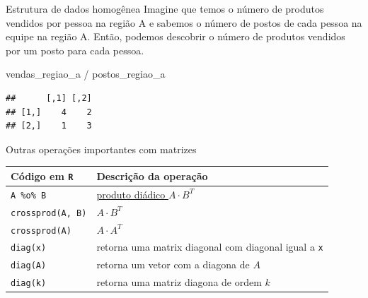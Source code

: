\documentclass[
  10pt,
  ignorenonframetext,
]{beamer}
\newenvironment{Shaded}{}{}
\newcommand{\NormalTok}[1]{#1}
\newcommand{\OperatorTok}[1]{#1}
\newcommand{\StringTok}[1]{\textcolor[rgb]{0.00,0.50,0.50}{#1}}
\begin{document}
\begin{frame}[fragile]{Estrutura de dados homogênea}
\protect\hypertarget{estrutura-de-dados-homoguxeanea-16}{}
Imagine que temos o número de produtos vendidos por pessoa na região A e
sabemos o número de postos de cada pessoa na equipe na região A. Então,
podemos descobrir o número de produtos vendidos por um posto para cada
pessoa.

\begin{Shaded}
\begin{Highlighting}[]
\NormalTok{vendas\_regiao\_a }\OperatorTok{/}\StringTok{ }\NormalTok{postos\_regiao\_a}
\end{Highlighting}
\end{Shaded}

\begin{verbatim}
##      [,1] [,2]
## [1,]    4    2
## [2,]    1    3
\end{verbatim}
\end{frame}

\begin{frame}[fragile]{Outras operações importantes com matrizes}
\protect\hypertarget{outras-operauxe7uxf5es-importantes-com-matrizes}{}
\begin{longtable}[]{@{}ll@{}}
\toprule
Código em \texttt{R} & Descrição da operação\tabularnewline
\midrule
\endhead
\texttt{A\ \%o\%\ B} &
\href{https://pt.wikipedia.org/wiki/Produto_diádico}{produto diádico
\(A\cdot B^T\)}\tabularnewline
\texttt{crossprod(A,\ B)} &
\href{https://pt.wikipedia.org/wiki/Produto_diádico}{\(A\cdot B^T\)}\tabularnewline
\texttt{crossprod(A)} &
\href{https://pt.wikipedia.org/wiki/Produto_diádico}{\(A\cdot A^T\)}\tabularnewline
\texttt{diag(x)} & retorna uma matrix diagonal com diagonal igual a
\texttt{x}\tabularnewline
\texttt{diag(A)} & retorna um vetor com a diagona de
\(A\)\tabularnewline
\texttt{diag(k)} & retorna uma matriz diagona de ordem
\(k\)\tabularnewline
\bottomrule
\end{longtable}
\end{frame}
\end{document}
